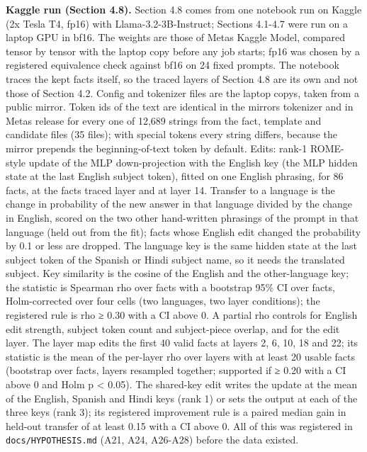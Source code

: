 \documentclass[11pt]{article}
\begin{document}
\textbf{Kaggle run (Section 4.8).} Section 4.8 comes from one notebook run on Kaggle (2x Tesla T4, fp16) with Llama-3.2-3B-Instruct; Sections 4.1-4.7 were run on a laptop GPU in bf16. The weights are those of Meta\textquotesingle s Kaggle Model, compared tensor by tensor with the laptop copy before any job starts; fp16 was chosen by a registered equivalence check against bf16 on 24 fixed prompts. The notebook traces the kept facts itself, so the traced layers of Section 4.8 are its own and not those of Section 4.2. Config and tokenizer files are the laptop copy\textquotesingle s, taken from a public mirror. Token ids of the text are identical in the mirror\textquotesingle s tokenizer and in Meta\textquotesingle s release for every one of 12,689 strings from the fact, template and candidate files (35 files); with special tokens every string differs, because the mirror prepends the beginning-of-text token by default. Edits: rank-1 ROME-style update of the MLP down-projection with the English key (the MLP hidden state at the last English subject token), fitted on one English phrasing, for 86 facts, at the fact\textquotesingle s traced layer and at layer 14. Transfer to a language is the change in probability of the new answer in that language divided by the change in English, scored on the two other hand-written phrasings of the prompt in that language (held out from the fit); facts whose English edit changed the probability by 0.1 or less are dropped. The language key is the same hidden state at the last subject token of the Spanish or Hindi subject name, so it needs the translated subject. Key similarity is the cosine of the English and the other-language key; the statistic is Spearman rho over facts with a bootstrap 95\% CI over facts, Holm-corrected over four cells (two languages, two layer conditions); the registered rule is rho ≥ 0.30 with a CI above 0. A partial rho controls for English edit strength, subject token count and subject-piece overlap, and for the edit layer. The layer map edits the first 40 valid facts at layers 2, 6, 10, 18 and 22; its statistic is the mean of the per-layer rho over layers with at least 20 usable facts (bootstrap over facts, layers resampled together; supported if ≥ 0.20 with a CI above 0 and Holm p \textless{} 0.05). The shared-key edit writes the update at the mean of the English, Spanish and Hindi keys (rank 1) or sets the output at each of the three keys (rank 3); its registered improvement rule is a paired median gain in held-out transfer of at least 0.15 with a CI above 0. All of this was registered in \texttt{docs/HYPOTHESIS.md} (A21, A24, A26-A28) before the data existed.
\end{document}
